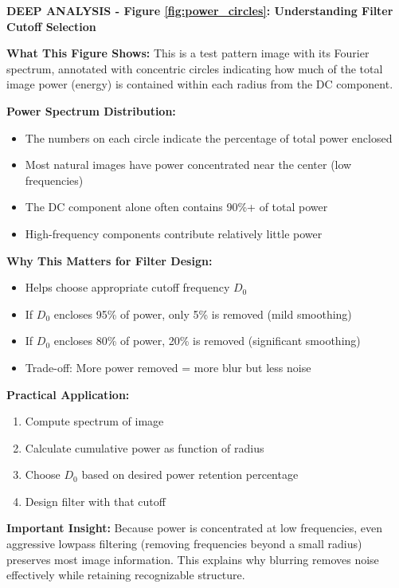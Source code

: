 \documentclass[12pt,a4paper]{article}
\begin{document}
\begin{deepexplanation}
\textbf{DEEP ANALYSIS - Figure \ref{fig:power_circles}: Understanding Filter Cutoff Selection}

\textbf{What This Figure Shows:}
This is a test pattern image with its Fourier spectrum, annotated with concentric circles indicating how much of the total image power (energy) is contained within each radius from the DC component.

\textbf{Power Spectrum Distribution:}
\begin{itemize}
    \item The numbers on each circle indicate the percentage of total power enclosed
    \item Most natural images have power concentrated near the center (low frequencies)
    \item The DC component alone often contains 90\%+ of total power
    \item High-frequency components contribute relatively little power
\end{itemize}

\textbf{Why This Matters for Filter Design:}
\begin{itemize}
    \item Helps choose appropriate cutoff frequency $D_0$
    \item If $D_0$ encloses 95\% of power, only 5\% is removed (mild smoothing)
    \item If $D_0$ encloses 80\% of power, 20\% is removed (significant smoothing)
    \item Trade-off: More power removed = more blur but less noise
\end{itemize}

\textbf{Practical Application:}
\begin{enumerate}
    \item Compute spectrum of image
    \item Calculate cumulative power as function of radius
    \item Choose $D_0$ based on desired power retention percentage
    \item Design filter with that cutoff
\end{enumerate}

\textbf{Important Insight:}
Because power is concentrated at low frequencies, even aggressive lowpass filtering (removing frequencies beyond a small radius) preserves most image information. This explains why blurring removes noise effectively while retaining recognizable structure.
\end{deepexplanation}
\end{document}
